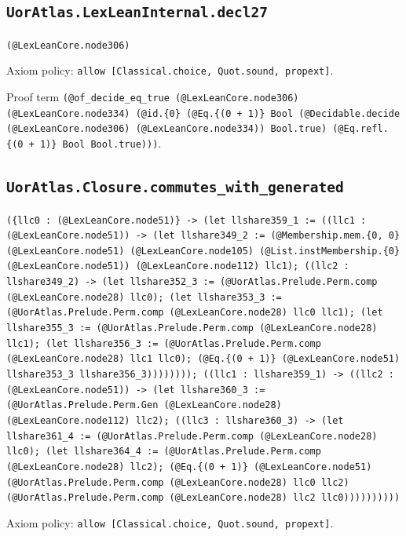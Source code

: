 \documentclass[11pt]{article}
\begin{document}
\subsection*{\texttt{UorAtlas.LexLeanInternal.decl27}}
\noindent\texttt{(@LexLeanCore.node306)}\par
\noindent Axiom policy: \texttt{allow [Classical.choice, Quot.sound, propext]}.\par
\noindent Proof term \texttt{(@of\_decide\_eq\_true (@LexLeanCore.node306) (@LexLeanCore.node334) (@id.\{0\} (@Eq.\{(0 + 1)\} Bool (@Decidable.decide (@LexLeanCore.node306) (@LexLeanCore.node334)) Bool.true) (@Eq.refl.\{(0 + 1)\} Bool Bool.true)))}.\par
\subsection*{\texttt{UorAtlas.Closure.commutes\_with\_generated}}
\noindent\texttt{(\{llc0 : (@LexLeanCore.node51)\} -> (let llshare359\_1 := ((llc1 : (@LexLeanCore.node51)) -> (let llshare349\_2 := (@Membership.mem.\{0, 0\} (@LexLeanCore.node51) (@LexLeanCore.node105) (@List.instMembership.\{0\} (@LexLeanCore.node51)) (@LexLeanCore.node112) llc1); ((llc2 : llshare349\_2) -> (let llshare352\_3 := (@UorAtlas.Prelude.Perm.comp (@LexLeanCore.node28) llc0); (let llshare353\_3 := (@UorAtlas.Prelude.Perm.comp (@LexLeanCore.node28) llc0 llc1); (let llshare355\_3 := (@UorAtlas.Prelude.Perm.comp (@LexLeanCore.node28) llc1); (let llshare356\_3 := (@UorAtlas.Prelude.Perm.comp (@LexLeanCore.node28) llc1 llc0); (@Eq.\{(0 + 1)\} (@LexLeanCore.node51) llshare353\_3 llshare356\_3)))))))); ((llc1 : llshare359\_1) -> ((llc2 : (@LexLeanCore.node51)) -> (let llshare360\_3 := (@UorAtlas.Prelude.Perm.Gen (@LexLeanCore.node28) (@LexLeanCore.node112) llc2); ((llc3 : llshare360\_3) -> (let llshare361\_4 := (@UorAtlas.Prelude.Perm.comp (@LexLeanCore.node28) llc0); (let llshare364\_4 := (@UorAtlas.Prelude.Perm.comp (@LexLeanCore.node28) llc2); (@Eq.\{(0 + 1)\} (@LexLeanCore.node51) (@UorAtlas.Prelude.Perm.comp (@LexLeanCore.node28) llc0 llc2) (@UorAtlas.Prelude.Perm.comp (@LexLeanCore.node28) llc2 llc0))))))))))}\par
\noindent Axiom policy: \texttt{allow [Classical.choice, Quot.sound, propext]}.\par
\end{document}
